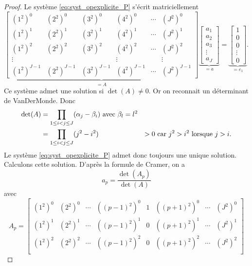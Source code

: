 \begin{proof}
Le système \eqref{eq:syst_opexplicite_P} s'écrit matriciellement
\begin{equation}
\underbrace{\begin{bmatrix}
(1^2)^0 & (2^2)^0 & (3^2)^0 & (4^2)^0 & \cdots & (J^2)^0\\
(1^2)^1 & (2^2)^1 & (3^2)^1 & (4^2)^1 & \cdots & (J^2)^1\\
(1^2)^2 & (2^2)^2 & (3^2)^2 & (4^2)^2 & \cdots & (J^2)^2\\
\vdots  &         &         & \vdots  &        &  \vdots\\
(1^2)^{J-1} & (2^2)^{J-1} & (3^2)^{J-1} & (4^2)^{J-1} & \cdots & (J^2)^{J-1}
\end{bmatrix}}_{= A}
\underbrace{\begin{bmatrix}
a_1 \\ a_2 \\ a_3 \\ \vdots \\ a_J
\end{bmatrix}
}_{=a} = \underbrace{\begin{bmatrix}
1 \\ 0 \\ 0 \\ \vdots \\ 0
\end{bmatrix}
}_{= e_1}.
\end{equation}
Ce système admet une solution si $\det (A) \neq 0$. Or on reconnait un déterminant de VanDerMonde. Donc
\begin{align*}
\det (A) & = \displaystyle\prod\limits_{1\leq i < j \leq J} (\alpha_j - \beta_i) \text{ avec } \beta_l = l^2 \\
	& = \displaystyle\prod\limits_{1\leq i < j \leq J} (j^2 - i^2)
	& > 0 \text{ car } j^2 > i^2 \text{ lorsque } j>i.
\end{align*}
Le système \eqref{eq:syst_opexplicite_P} admet donc toujours une unique solution. Calculons cette solution. D'après la formule de Cramer, on a 
\begin{equation}
a_p = \dfrac{\det (A_p)}{\det (A)}
\end{equation}
avec
\begin{equation}
A_p = \begin{bmatrix}
(1^2)^0 & (2^2)^0 & \cdots & ((p-1)^2)^0 & 1 & ((p+1)^2)^0 & \cdots & (J^2)^0 \\ 
(1^2)^1 & (2^2)^1 & \cdots & ((p-1)^2)^1 & 0 & ((p+1)^2)^1 & \cdots & (J^2)^1 \\
(1^2)^2 & (2^2)^2 & \cdots & ((p-1)^2)^2 & 0 & ((p+1)^2)^2 & \cdots & (J^2)^2 \\

\end{bmatrix}
\end{equation}
\end{proof}
